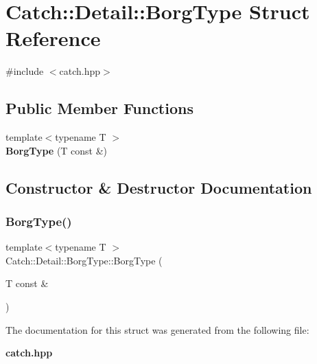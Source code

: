 \section{Catch\+:\+:Detail\+:\+:Borg\+Type Struct Reference}
\label{struct_catch_1_1_detail_1_1_borg_type}


{\ttfamily \#include $<$catch.\+hpp$>$}

\subsection*{Public Member Functions}
\begin{DoxyCompactItemize}
\item 
{\footnotesize template$<$typename T $>$ }\\\textbf{ Borg\+Type} (T const \&)
\end{DoxyCompactItemize}


\subsection{Constructor \& Destructor Documentation}
\mbox{\label{struct_catch_1_1_detail_1_1_borg_type_a780a9946ed0d654f0bfc043c8fc505d8}} 
\subsubsection{Borg\+Type()}
{\footnotesize\ttfamily template$<$typename T $>$ \\
Catch\+::\+Detail\+::\+Borg\+Type\+::\+Borg\+Type (\begin{DoxyParamCaption}\item[{T const \&}]{ }\end{DoxyParamCaption})}



The documentation for this struct was generated from the following file\+:\begin{DoxyCompactItemize}
\item 
\textbf{ catch.\+hpp}\end{DoxyCompactItemize}
